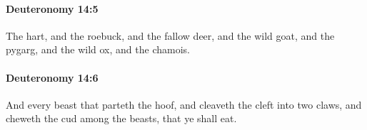 		\paragraph{Deuteronomy 14:5} %
			\label{DEUTERONOMY-14-5}

			The hart, and the roebuck, and the fallow deer, and the wild goat, and the pygarg, and the wild ox, and the chamois.


		\paragraph{Deuteronomy 14:6} %
			\label{DEUTERONOMY-14-6}

			And every beast that parteth the hoof, and cleaveth the cleft into two claws, and cheweth the cud among the beasts, that ye shall eat.


